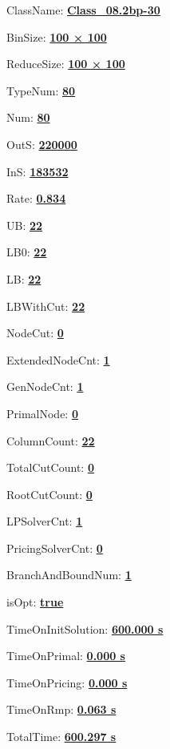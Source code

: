 \documentclass[11pt]{article}
\begin{document}
\pagestyle{empty}


ClassName: \underline{\textbf{Class_08.2bp-30}}
\par
BinSize: \underline{\textbf{100 × 100}}
\par
ReduceSize: \underline{\textbf{100 × 100}}
\par
TypeNum: \underline{\textbf{80}}
\par
Num: \underline{\textbf{80}}
\par
OutS: \underline{\textbf{220000}}
\par
InS: \underline{\textbf{183532}}
\par
Rate: \underline{\textbf{0.834}}
\par
UB: \underline{\textbf{22}}
\par
LB0: \underline{\textbf{22}}
\par
LB: \underline{\textbf{22}}
\par
LBWithCut: \underline{\textbf{22}}
\par
NodeCut: \underline{\textbf{0}}
\par
ExtendedNodeCnt: \underline{\textbf{1}}
\par
GenNodeCnt: \underline{\textbf{1}}
\par
PrimalNode: \underline{\textbf{0}}
\par
ColumnCount: \underline{\textbf{22}}
\par
TotalCutCount: \underline{\textbf{0}}
\par
RootCutCount: \underline{\textbf{0}}
\par
LPSolverCnt: \underline{\textbf{1}}
\par
PricingSolverCnt: \underline{\textbf{0}}
\par
BranchAndBoundNum: \underline{\textbf{1}}
\par
isOpt: \underline{\textbf{true}}
\par
TimeOnInitSolution: \underline{\textbf{600.000 s}}
\par
TimeOnPrimal: \underline{\textbf{0.000 s}}
\par
TimeOnPricing: \underline{\textbf{0.000 s}}
\par
TimeOnRmp: \underline{\textbf{0.063 s}}
\par
TotalTime: \underline{\textbf{600.297 s}}
\par
\newpage


\end{document}
